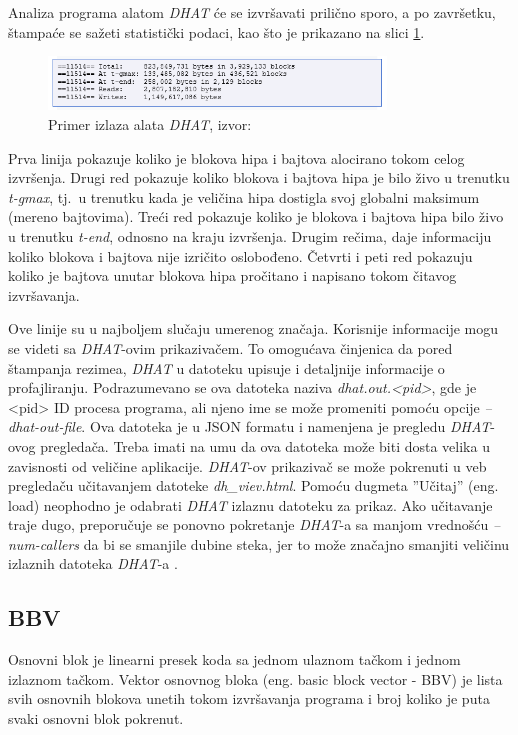 \documentclass[12pt,oneside]{memoir}
\theoremstyle{plain}
\theoremstyle{definition}
\begin{document}
Analiza programa alatom \textit{DHAT} će se izvršavati prilično sporo, a po završetku, štampaće se sažeti statistički podaci, kao što je prikazano na slici \ref{fig:slika2.24}.
\begin{figure}[!ht]
  \centering
  \includegraphics[width=0.8\textwidth]{DHAT.png}
  \caption{Primer izlaza alata \textit{DHAT}, izvor: \cite{DHAT}}
  \label{fig:slika2.24}
\end{figure}

Prva linija pokazuje koliko je blokova hipa i bajtova alocirano tokom celog izvršenja. Drugi red pokazuje koliko blokova i bajtova hipa je bilo živo u trenutku \textit{t-gmax}, tj.~u trenutku kada je veličina hipa dostigla svoj globalni maksimum (mereno bajtovima). Treći red pokazuje koliko je blokova i bajtova hipa bilo živo u trenutku \textit{t-end}, odnosno na kraju izvršenja. Drugim rečima, daje informaciju koliko blokova i bajtova nije izričito oslobođeno. Četvrti i peti red pokazuju koliko je bajtova unutar blokova hipa pročitano i napisano tokom čitavog izvršavanja.

Ove linije su u najboljem slučaju umerenog značaja. Korisnije informacije mogu se videti sa \textit{DHAT}-ovim prikazivačem. To omogućava činjenica da pored štampanja rezimea, \textit{DHAT} u datoteku upisuje i detaljnije informacije o profajliranju. Podrazumevano se ova datoteka naziva \textit{dhat.out.<pid>}, gde je <pid> ID procesa programa, ali njeno ime se može promeniti pomoću opcije \textit{--dhat-out-file}. Ova datoteka je u JSON formatu i namenjena je pregledu \textit{DHAT}-ovog pregledača. Treba imati na umu da ova datoteka može biti dosta velika u zavisnosti od veličine aplikacije. 
\textit{DHAT}-ov prikazivač se može pokrenuti u veb pregledaču učitavanjem datoteke \textit{dh\_viev.html}. Pomoću dugmeta ''Učitaj'' (eng. load) neophodno je odabrati \textit{DHAT} izlaznu datoteku za prikaz. Ako učitavanje traje dugo, preporučuje se ponovno pokretanje \textit{DHAT}-a sa manjom vrednošću \textit{--num-callers} da bi se smanjile dubine steka, jer to može značajno smanjiti veličinu izlaznih datoteka \textit{DHAT}-a \cite{DHAT}. 

\subsection{BBV}
Osnovni blok je linearni presek koda sa jednom ulaznom tačkom i jednom izlaznom tačkom. Vektor osnovnog bloka (eng. basic block vector - BBV) je lista svih osnovnih blokova unetih tokom izvršavanja programa i broj koliko je puta svaki osnovni blok pokrenut.
\end{document}
